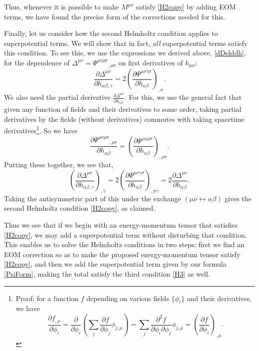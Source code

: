 \documentclass[aps,physrev,preprint,groupedaddress]{revtex4-2}
\begin{document}
Thus, whenever it is possible to make \(M^{\mu\nu}\) satisfy \eqref{H2copy} by adding EOM terms, we have found the precise form of the corrections needed for this.

Finally, let us consider how the second Helmholtz condition applies to superpotential terms. We will show that in fact, \textit{all} superpotential terms satisfy this condition. To see this, we use the expressions we derived above, \eqref{dDelddh}, for the dependence of \(\Delta^{\mu\nu}=\Psi^{\mu\nu\rho\sigma}{}_{,\rho\sigma}\) on first derivatives of \(h_{\mu\nu}\):
\begin{equation}
\frac{\partial \Delta^{\mu\nu}}{\partial h_{\alpha\beta,\gamma}}=2{\left(\frac{\partial \Psi^{\mu\nu\gamma\sigma}}{\partial h_{\alpha\beta}}\right)}_{,\sigma}.
\end{equation}
We also need the partial derivative \(\frac{\partial\Delta^{\mu\nu}}{\partial h_{\alpha\beta}}\). For this, we use the general fact that given any function of fields and their derivatives to some order, taking partial derivatives by the fields (without derivatives) commutes with taking spacetime derivatives\footnote{Proof: for a function \(f\) depending on various fields \(\{\phi_i\}\) and their derivatives, we have 
\begin{equation}
\frac{\partial f_{,\mu}}{\partial\phi_i}=\frac{\partial }{\partial\phi_i}\left(\sum_j\frac{\partial f}{\partial\phi_j}\phi_{j,\mu}\right)=\sum_j\frac{\partial^2 f}{\partial\phi_i\partial\phi_j}\phi_{j,\mu}=\left(\frac{\partial f}{\partial\phi_i}\right)_{,\mu}.
\end{equation}
}. So we have
\begin{equation}
\frac{\partial \Psi^{\mu\nu\rho\sigma}{}_{,\rho\sigma}}{\partial h_{\alpha\beta}}={\left(\frac{\partial \Psi^{\mu\nu\rho\sigma}}{\partial h_{\alpha\beta}}\right)}_{,\rho\sigma}.  
\end{equation}
Putting these together, we see that,
\begin{equation}
{\left(\frac{\partial \Delta^{\mu\nu}}{\partial h_{\alpha\beta,\gamma}}\right)}_{,\gamma}=2{\left(\frac{\partial \Psi^{\mu\nu\gamma\sigma}}{\partial h_{\alpha\beta}}\right)}_{,\sigma\gamma}=2\frac{\partial\Delta^{\mu\nu}}{\partial h_{\alpha\beta}}.
\end{equation}
Taking the antisymmetric part of this under the exchange \((\mu\nu\leftrightarrow\alpha\beta)\) gives the second Helmholtz condition \eqref{H2copy}, as claimed.

Thus we see that if we begin with an energy-momentum tensor that satisfies \eqref{H2copy}, we may add a superpotential term without disturbing that condition. This enables us to solve the Helmholtz conditions in two steps: first we find an EOM correction so as to make the proposed energy-momentum tensor satisfy \eqref{H2copy}, and then we add the superpotential term given by our formula \eqref{PsiForm}, making the total satisfy the third condition \eqref{H3} as well. 
\end{document}
